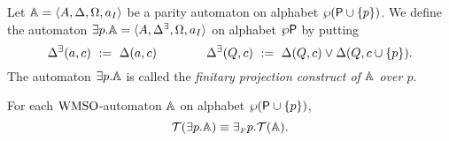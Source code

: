 
\begin{definition}\label{DEF_fin_projection}
Let $\mathbb{A} = \langle{A, \Delta, \Omega, a_I}\rangle$ be a parity automaton on alphabet $\wp(\mathsf{P} \cup \{p\})$. We define the automaton ${{\exists} p}.\mathbb{A} = \langle{A, \Delta^\exists, \Omega, a_I}\rangle$ on alphabet $\wp\mathsf{P}$ by putting
\begin{equation*}
  \Delta^\exists(a,c) \ \mathrel{: =} \ \Delta(a,c) \qquad \qquad
  \Delta^\exists(Q,c) \ \mathrel{: =} \ \Delta(Q,c) \vee \Delta(Q,c\cup\{p\}).
\end{equation*}
The automaton ${{\exists} p}.\mathbb{A}$ is called the \emph{finitary projection
construct of $\mathbb{A}$ over $p$}.
\end{definition}


\begin{lemma}\label{PROP_fin_projection} For each $\mathrm{WMSO}$-automaton $\mathbb{A}$ on alphabet $\wp (\mathsf{P} \cup \{p\})$, $$\mathcal{T}({{\exists} p}.\mathbb{A}) \equiv
{{\exists_{{\scriptscriptstyle F}}} p}.\mathcal{T}(\mathbb{A}).$$
\end{lemma}

